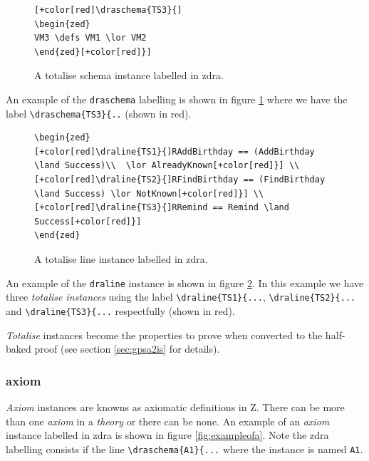 \begin{figure}[H]
\centering
\begin{footnotesize}
\begin{BVerbatim}[commandchars=+\[\]]
[+color[red]\draschema{TS3}{]
\begin{zed}
VM3 \defs VM1 \lor VM2
\end{zed}[+color[red]}]
\end{BVerbatim}
\end{footnotesize}
\caption{\label{fig:exampleofts1} A totalise schema instance labelled in \gls{zdra}.}
\end{figure}

An example of the \verb|draschema| labelling is shown in figure \ref{fig:exampleofts1} where we have the label \verb|\draschema{TS3}{..| (shown in red).

\begin{figure}[H]
\centering
\begin{footnotesize}
\begin{BVerbatim}[commandchars=+\[\]]
\begin{zed} 
[+color[red]\draline{TS1}{]RAddBirthday == (AddBirthday \land Success)\\  \lor AlreadyKnown[+color[red]}] \\
[+color[red]\draline{TS2}{]RFindBirthday == (FindBirthday \land Success) \lor NotKnown[+color[red]}] \\
[+color[red]\draline{TS3}{]RRemind == Remind \land Success[+color[red]}]
\end{zed}
\end{BVerbatim}
\end{footnotesize}
\caption{\label{fig:exampleofts2} A totalise line instance labelled in \gls{zdra}.}
\end{figure}

An example of the \verb|draline| instance is shown in figure \ref{fig:exampleofts2}. In this example we have three \emph{totalise instances} using the label \verb|\draline{TS1}{...|, \verb|\draline{TS2}{...| and \verb|\draline{TS3}{...| respectfully (shown in red).

\emph{Totalise} instances become the properties to prove when converted to the half-baked proof (see section \ref{sec:gpsa2is} for details).


\subsubsection{axiom}

\emph{Axiom} instances are knowns as axiomatic definitions in Z. There can be more than one \emph{axiom} in a \emph{theory} or there can be none. An example of an \emph{axiom} instance labelled in \gls{zdra} is shown in figure \ref{fig:exampleofa}. Note the \gls{zdra} labelling consists if the line \verb|\draschema{A1}{...| where the instance is named \verb|A1|.

